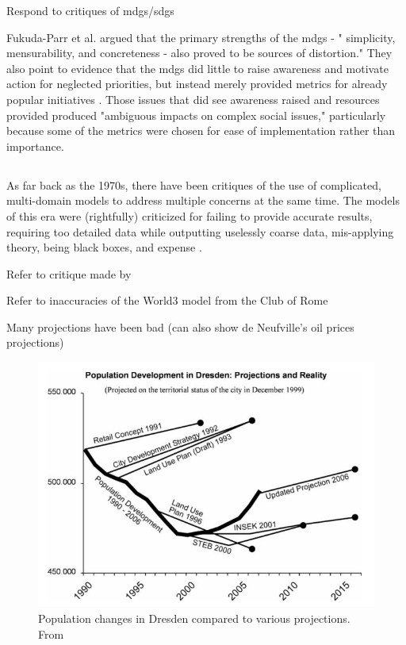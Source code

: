 Respond to critiques of \acp{mdg}/\acp{sdg} \cite{alstonShipsPassingNight2005, reddyGlobalDevelopmentGoals2008}

Fukuda-Parr et al. argued that the primary strengths of the \acp{mdg} - " simplicity, mensurability, and concreteness - also proved to be sources of distortion." They also point to evidence that the \acp{mdg} did little to raise awareness and motivate action for neglected priorities, but instead merely provided metrics for already popular initiatives \cite{fukuda-parrPowerNumbersCritical2014}. Those issues that did see awareness raised and resources provided produced "ambiguous impacts on complex social issues," particularly because some of the metrics were chosen for ease of implementation rather than importance.


\subsection{} \label{sec:scenario_critique}


As far back as the 1970s, there have been critiques of the use of complicated, multi-domain models to address multiple concerns at the same time. The models of this era were (rightfully) criticized for failing to provide accurate results, requiring too detailed data while outputting uselessly coarse data, mis-applying theory, being black boxes, and expense \cite{leejrRequiemLargeScaleModels1973}.

Refer to critique made by \cite{leejrRequiemLargeScaleModels1973}


Refer to inaccuracies of the World3 model from the Club of Rome

Many projections have been bad (can also show de Neufville's oil prices projections)


\begin{figure}[h]
	\centering
	\includegraphics[scale=0.45]{Figures/chap2/dresden_projections.png}
	\caption[Population changes in Dresden compared to various projections]{Population changes in Dresden compared to various projections. From \cite{wiechmannErrorsExpectedAligning2008}}
	\label{fig:dresden_population}
\end{figure}

